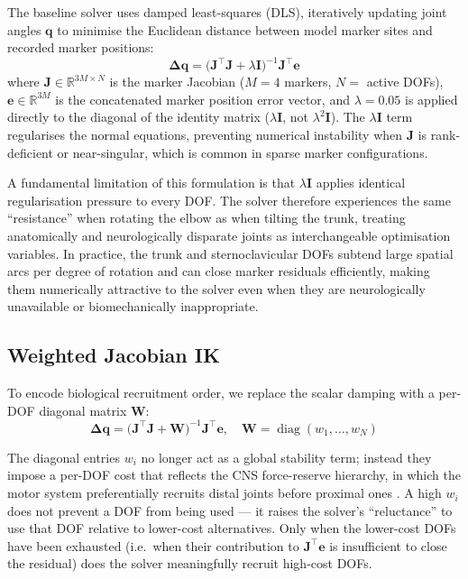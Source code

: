 \documentclass[journal,10pt,twocolumn]{IEEEtran}
\begin{document}
The baseline solver uses damped least-squares (DLS), iteratively updating
joint angles $\mathbf{q}$ to minimise the Euclidean distance between model
marker sites and recorded marker positions:
\begin{equation}
  \mathbf{\Delta q} =
    \bigl(\mathbf{J}^\top\mathbf{J} + \lambda\mathbf{I}\bigr)^{-1}
    \mathbf{J}^\top \mathbf{e}
  \label{eq:standard_dls}
\end{equation}
where $\mathbf{J}\!\in\!\mathbb{R}^{3M\times N}$ is the marker Jacobian
($M=4$ markers, $N=$ active DOFs), $\mathbf{e}\!\in\!\mathbb{R}^{3M}$ is the
concatenated marker position error vector, and $\lambda = 0.05$ is applied
directly to the diagonal of the identity matrix ($\lambda\mathbf{I}$, not
$\lambda^{2}\mathbf{I}$). The $\lambda\mathbf{I}$ term regularises the normal
equations, preventing numerical instability when $\mathbf{J}$ is rank-deficient
or near-singular, which is common in sparse marker configurations.

A fundamental limitation of this formulation is that $\lambda\mathbf{I}$
applies identical regularisation pressure to every DOF. The solver therefore
experiences the same ``resistance'' when rotating the elbow as when tilting the
trunk, treating anatomically and neurologically disparate joints as
interchangeable optimisation variables. In practice, the trunk and
sternoclavicular DOFs subtend large spatial arcs per degree of rotation and
can close marker residuals efficiently, making them numerically attractive to
the solver even when they are neurologically unavailable or biomechanically
inappropriate.

\subsection{Weighted Jacobian IK}
\label{sec:weighted}

To encode biological recruitment order, we replace the scalar damping with a
per-DOF diagonal matrix $\mathbf{W}$:
\begin{equation}
  \mathbf{\Delta q} =
    \bigl(\mathbf{J}^\top\mathbf{J} + \mathbf{W}\bigr)^{-1}
    \mathbf{J}^\top \mathbf{e}, \quad
  \mathbf{W} = \operatorname{diag}(w_1,\ldots,w_N)
  \label{eq:weighted_dls}
\end{equation}

The diagonal entries $w_i$ no longer act as a global stability term; instead
they impose a per-DOF cost that reflects the CNS force-reserve hierarchy, in
which the motor system preferentially recruits distal joints before proximal
ones \cite{cirstea2000}. A high $w_i$ does not prevent a DOF from being used
--- it raises the solver's ``reluctance'' to use that DOF relative to
lower-cost alternatives. Only when the lower-cost DOFs have been exhausted
(i.e.\ when their contribution to $\mathbf{J}^\top\mathbf{e}$ is insufficient
to close the residual) does the solver meaningfully recruit high-cost DOFs.
\end{document}
